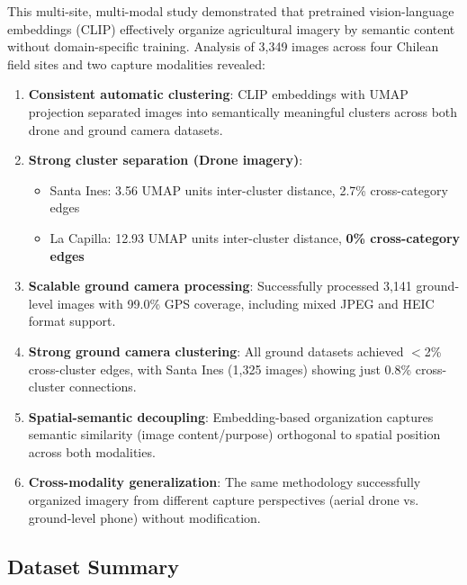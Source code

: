 
This multi-site, multi-modal study demonstrated that pretrained vision-language embeddings (CLIP) effectively organize agricultural imagery by semantic content without domain-specific training. Analysis of 3,349 images across four Chilean field sites and two capture modalities revealed:

\begin{enumerate}
    \item \textbf{Consistent automatic clustering}: CLIP embeddings with UMAP projection separated images into semantically meaningful clusters across both drone and ground camera datasets.

    \item \textbf{Strong cluster separation (Drone imagery)}:
    \begin{itemize}
        \item Santa Ines: 3.56 UMAP units inter-cluster distance, 2.7\% cross-category edges
        \item La Capilla: 12.93 UMAP units inter-cluster distance, \textbf{0\% cross-category edges}
    \end{itemize}

    \item \textbf{Scalable ground camera processing}: Successfully processed 3,141 ground-level images with 99.0\% GPS coverage, including mixed JPEG and HEIC format support.

    \item \textbf{Strong ground camera clustering}: All ground datasets achieved $<$2\% cross-cluster edges, with Santa Ines (1,325 images) showing just 0.8\% cross-cluster connections.

    \item \textbf{Spatial-semantic decoupling}: Embedding-based organization captures semantic similarity (image content/purpose) orthogonal to spatial position across both modalities.

    \item \textbf{Cross-modality generalization}: The same methodology successfully organized imagery from different capture perspectives (aerial drone vs. ground-level phone) without modification.
\end{enumerate}

\subsection*{Dataset Summary}

